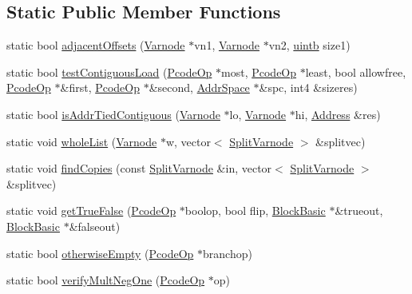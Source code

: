 \subsection*{Static Public Member Functions}
\begin{DoxyCompactItemize}
\item 
static bool \mbox{\hyperlink{class_split_varnode_a575ad9769e03bfa8abbaf398f5952af4}{adjacent\+Offsets}} (\mbox{\hyperlink{class_varnode}{Varnode}} $\ast$vn1, \mbox{\hyperlink{class_varnode}{Varnode}} $\ast$vn2, \mbox{\hyperlink{types_8h_a2db313c5d32a12b01d26ac9b3bca178f}{uintb}} size1)
\item 
static bool \mbox{\hyperlink{class_split_varnode_a633feccdecafe2850128bbc8e530f24b}{test\+Contiguous\+Load}} (\mbox{\hyperlink{class_pcode_op}{Pcode\+Op}} $\ast$most, \mbox{\hyperlink{class_pcode_op}{Pcode\+Op}} $\ast$least, bool allowfree, \mbox{\hyperlink{class_pcode_op}{Pcode\+Op}} $\ast$\&first, \mbox{\hyperlink{class_pcode_op}{Pcode\+Op}} $\ast$\&second, \mbox{\hyperlink{class_addr_space}{Addr\+Space}} $\ast$\&spc, int4 \&sizeres)
\item 
static bool \mbox{\hyperlink{class_split_varnode_ac857d72933606a431013da7fb0883ddf}{is\+Addr\+Tied\+Contiguous}} (\mbox{\hyperlink{class_varnode}{Varnode}} $\ast$lo, \mbox{\hyperlink{class_varnode}{Varnode}} $\ast$hi, \mbox{\hyperlink{class_address}{Address}} \&res)
\item 
static void \mbox{\hyperlink{class_split_varnode_a0d560dff52dab6123bc6b3d996ad2a29}{whole\+List}} (\mbox{\hyperlink{class_varnode}{Varnode}} $\ast$w, vector$<$ \mbox{\hyperlink{class_split_varnode}{Split\+Varnode}} $>$ \&splitvec)
\item 
static void \mbox{\hyperlink{class_split_varnode_a565abf157db41c402ce92a365f51e600}{find\+Copies}} (const \mbox{\hyperlink{class_split_varnode}{Split\+Varnode}} \&in, vector$<$ \mbox{\hyperlink{class_split_varnode}{Split\+Varnode}} $>$ \&splitvec)
\item 
static void \mbox{\hyperlink{class_split_varnode_ad6de8bc5b9902d2870ef350aeea58c3e}{get\+True\+False}} (\mbox{\hyperlink{class_pcode_op}{Pcode\+Op}} $\ast$boolop, bool flip, \mbox{\hyperlink{class_block_basic}{Block\+Basic}} $\ast$\&trueout, \mbox{\hyperlink{class_block_basic}{Block\+Basic}} $\ast$\&falseout)
\item 
static bool \mbox{\hyperlink{class_split_varnode_a9f91b0588de935c3f07a1cb7e59949a5}{otherwise\+Empty}} (\mbox{\hyperlink{class_pcode_op}{Pcode\+Op}} $\ast$branchop)
\item 
static bool \mbox{\hyperlink{class_split_varnode_a7f475a7c1f0b3e3d2d11dba2f52d5572}{verify\+Mult\+Neg\+One}} (\mbox{\hyperlink{class_pcode_op}{Pcode\+Op}} $\ast$op)

\end{DoxyCompactItemize}

